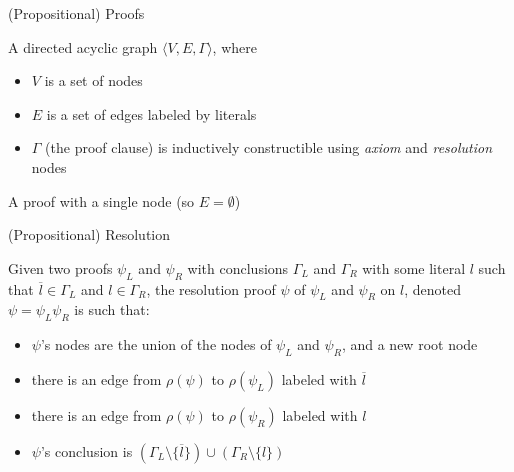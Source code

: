 {
\begin{frame}{(Propositional) Proofs}

\begin{definition}[Proof]
A directed acyclic graph $\langle V,E,\Gamma \rangle$, where
\begin{itemize}
\item $V$ is a set of nodes
\item $E$ is a set of edges labeled by literals
\item $\Gamma$ (the proof clause) is inductively constructible using \emph{axiom} and \emph{resolution} nodes
\end{itemize}
\end{definition}

\begin{definition}[Axiom]
A proof with a single node (so $E=\emptyset$)
\end{definition}
\end{frame}
}

{
\begin{frame}{(Propositional) Resolution}
\begin{definition}[Resolution]
Given two proofs $\psi_L$ and $\psi_R$ with conclusions $\Gamma_L$ and $\Gamma_R$ with some literal $l$ such that $\overline{l}\in \Gamma_L$ and $l\in \Gamma_R$, the resolution proof $\psi$ of $\psi_L$ and $\psi_R$ on $l$, denoted $\psi=\psi_L \psi_R$ is such that:
\begin{itemize}
\item $\psi$'s nodes are the union of the nodes of $\psi_L$ and $\psi_R$, and a new root node
\item there is an edge from $\rho(\psi)$ to $\rho(\psi_L)$ labeled with $\overline{l}$
\item there is an edge from $\rho(\psi)$ to $\rho(\psi_R)$ labeled with $l$
\item $\psi$'s conclusion is $(\Gamma_L\setminus\{\overline{l}\})\cup(\Gamma_R\setminus\{l\})$
\end{itemize}
\end{definition}
\end{frame}
}